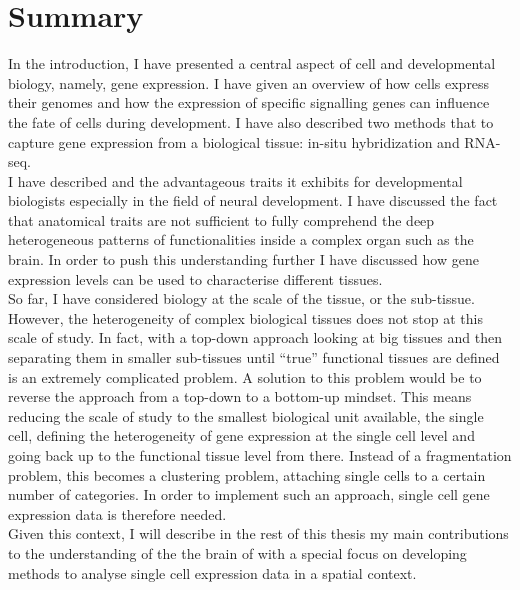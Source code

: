     
\section{Summary}
     
     

	In the introduction, I have presented a central aspect of cell and developmental biology, namely, gene expression. I have given an overview of how cells express their genomes and how the expression of specific signalling genes can influence the fate of cells during development. I have also described two methods that to capture gene expression from a biological tissue: in-situ hybridization and RNA-seq.\\
	
	I have described \platyfull{} and the advantageous traits it exhibits for developmental biologists especially in the field of neural development. I have discussed the fact that anatomical traits are not sufficient to fully comprehend the deep heterogeneous patterns of functionalities inside a complex organ such as the brain. In order to push this understanding further I have discussed how gene expression levels can be used to characterise different tissues.\\
	
	So far, I have considered biology at the scale of the tissue, or the sub-tissue. However, the heterogeneity of complex biological tissues does not stop at this scale of study. In fact, with a top-down approach looking at big tissues and then separating them in smaller sub-tissues until ``true'' functional tissues are defined is an extremely complicated problem. A solution to this problem would be to reverse the approach from a top-down to a bottom-up mindset. This means reducing the scale of study to the smallest biological unit available, the single cell, defining the heterogeneity of gene expression at the single cell level and going back up to the functional tissue level from there. Instead of a fragmentation problem, this becomes a clustering problem, attaching single cells to a certain number of categories. In order to implement such an approach, single cell gene expression data is therefore needed.\\
	
Given this context, I will describe in the rest of this thesis my main contributions to the understanding of the the brain of \platyfull{} with a special focus on developing methods to analyse single cell expression data in a spatial context. \\
	
